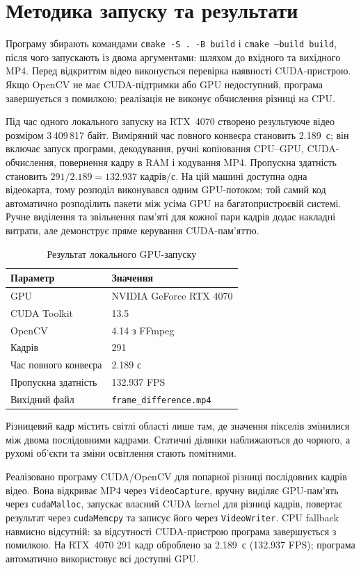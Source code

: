 \documentclass[14pt]{extarticle}
\begin{document}
\section{Методика запуску та результати}
Програму збирають командами \texttt{cmake -S . -B build} і \texttt{cmake --build build}, після чого запускають із двома аргументами: шляхом до вхідного та вихідного MP4. Перед відкриттям відео виконується перевірка наявності CUDA-пристрою. Якщо OpenCV не має CUDA-підтримки або GPU недоступний, програма завершується з помилкою; реалізація не виконує обчислення різниці на CPU.

Під час одного локального запуску на RTX~4070 створено результуюче відео розміром 3\,409\,817 байт. Виміряний час повного конвеєра становить 2.189~с; він включає запуск програми, декодування, ручні копіювання CPU--GPU, CUDA-обчислення, повернення кадру в RAM і кодування MP4. Пропускна здатність становить $291/2.189=132.937$ кадрів/с. На цій машині доступна одна відеокарта, тому розподіл виконувався одним GPU-потоком; той самий код автоматично розподілить пакети між усіма GPU на багатопристроєвій системі. Ручне виділення та звільнення пам'яті для кожної пари кадрів додає накладні витрати, але демонструє пряме керування CUDA-пам'яттю.

\begin{table}[htbp]
\caption{Результат локального GPU-запуску}
\centering
\begin{tabular}{ll}
\toprule
Параметр & Значення \\
\midrule
GPU & NVIDIA GeForce RTX 4070 \\
CUDA Toolkit & 13.5 \\
OpenCV & 4.14 з FFmpeg \\
Кадрів & 291 \\
Час повного конвеєра & 2.189 с \\
Пропускна здатність & 132.937 FPS \\
Вихідний файл & \texttt{frame\_difference.mp4} \\
\bottomrule
\end{tabular}
\end{table}

Різницевий кадр містить світлі області лише там, де значення пікселів змінилися між двома послідовними кадрами. Статичні ділянки наближаються до чорного, а рухомі об'єкти та зміни освітлення стають помітними.

Реалізовано програму CUDA/OpenCV для попарної різниці послідовних кадрів відео. Вона відкриває MP4 через \texttt{VideoCapture}, вручну виділяє GPU-пам'ять через \texttt{cudaMalloc}, запускає власний CUDA kernel для різниці кадрів, повертає результат через \texttt{cudaMemcpy} та записує його через \texttt{VideoWriter}. CPU fallback навмисно відсутній: за відсутності CUDA-пристрою програма завершується з помилкою. На RTX~4070 291 кадр оброблено за 2.189~с (132.937 FPS); програма автоматично використовує всі доступні GPU.
\end{document}
